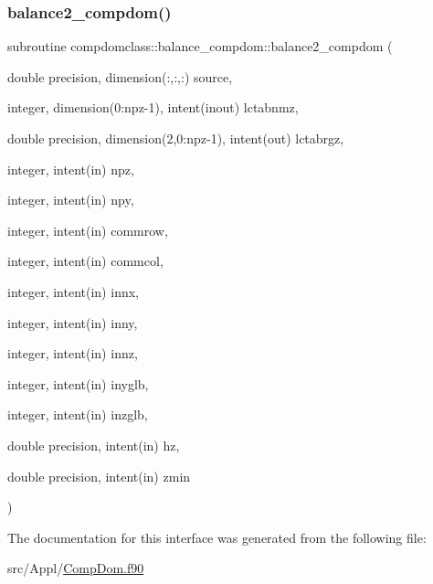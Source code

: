 \subsubsection{\texorpdfstring{balance2\_compdom()}{balance2\_compdom()}}
{\footnotesize\ttfamily subroutine compdomclass\+::balance\+\_\+compdom\+::balance2\+\_\+compdom (\begin{DoxyParamCaption}\item[{double precision, dimension(\+:,\+:,\+:)}]{source,  }\item[{integer, dimension(0\+:npz-\/1), intent(inout)}]{lctabnmz,  }\item[{double precision, dimension(2,0\+:npz-\/1), intent(out)}]{lctabrgz,  }\item[{integer, intent(in)}]{npz,  }\item[{integer, intent(in)}]{npy,  }\item[{integer, intent(in)}]{commrow,  }\item[{integer, intent(in)}]{commcol,  }\item[{integer, intent(in)}]{innx,  }\item[{integer, intent(in)}]{inny,  }\item[{integer, intent(in)}]{innz,  }\item[{integer, intent(in)}]{inyglb,  }\item[{integer, intent(in)}]{inzglb,  }\item[{double precision, intent(in)}]{hz,  }\item[{double precision, intent(in)}]{zmin }\end{DoxyParamCaption})}



The documentation for this interface was generated from the following file\+:\begin{DoxyCompactItemize}
\item 
src/\+Appl/\mbox{\hyperlink{_comp_dom_8f90}{Comp\+Dom.\+f90}}\end{DoxyCompactItemize}
